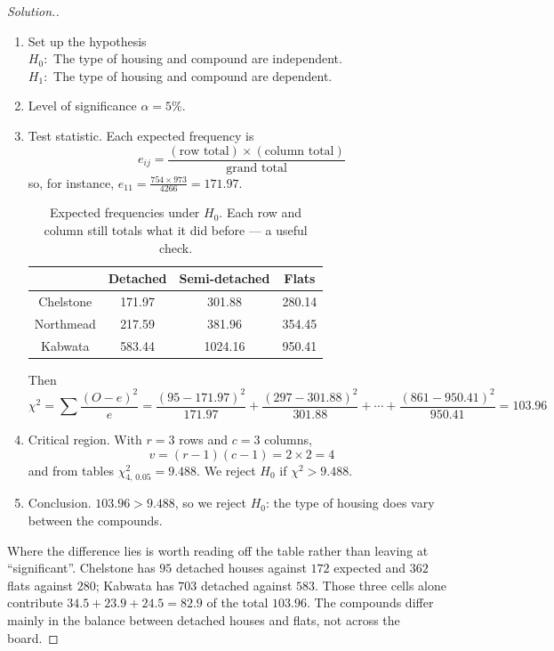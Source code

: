 \documentclass[11pt,a4paper]{article}
\theoremstyle{definition}
\newenvironment{solution}
  {\renewcommand{\qedsymbol}{}\begin{proof}[\textit{Solution}.]}
  {\end{proof}}
\begin{document}
\begin{solution}
\begin{enumerate}
\item Set up the hypothesis\\
$H_0:$ The type of housing and compound are independent.\\
$H_1:$ The type of housing and compound are dependent.
\item Level of significance $\alpha=5\%$.
\item Test statistic. Each expected frequency is
\[e_{ij}=\frac{(\text{row total})\times(\text{column total})}{\text{grand total}}\]
so, for instance, $e_{11}=\frac{754\times 973}{4266}=171.97$.
\begin{table}[H]
\centering
\begin{tabular}{c|ccc}
& Detached & Semi-detached & Flats\\
\hline Chelstone & 171.97 & 301.88 & 280.14\\
Northmead & 217.59 & 381.96 & 354.45\\
Kabwata & 583.44 & 1024.16 & 950.41\\
\end{tabular}
\caption{Expected frequencies under $H_0$. Each row and column still totals what it did before --- a useful check.}
\end{table}
Then
\[\chi^2=\sum\frac{(O-e)^2}{e}
=\frac{(95-171.97)^2}{171.97}+\frac{(297-301.88)^2}{301.88}+\cdots+\frac{(861-950.41)^2}{950.41}=103.96\]
\item Critical region. With $r=3$ rows and $c=3$ columns,
\[v=(r-1)(c-1)=2\times 2=4\]
and from tables $\chi^2_{4,\,0.05}=9.488$. We reject $H_0$ if $\chi^2>9.488$.
\item Conclusion. $103.96>9.488$, so we reject $H_0$: the type of housing does vary
between the compounds.
\end{enumerate}

Where the difference lies is worth reading off the table rather than leaving at
``significant''. Chelstone has $95$ detached houses against $172$ expected and $362$ flats
against $280$; Kabwata has $703$ detached against $583$. Those three cells alone contribute
$34.5+23.9+24.5=82.9$ of the total $103.96$. The compounds differ mainly in the balance
between detached houses and flats, not across the board.
\end{solution}


\end{document}
